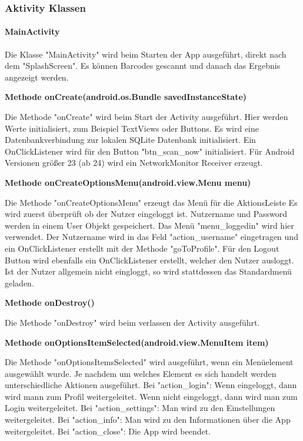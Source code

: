 \documentclass{scrartcl}
\begin{document}
\newpage

\subsubsection{Aktivity Klassen}

\paragraph{MainActivity}

\noindent Die Klasse "MainActivity" wird beim Starten der App ausgeführt, direkt nach dem "SplashScreen". Es können Barcodes gescannt und danach das Ergebnis angezeigt werden.\newline

\noindent\textbf{Methode onCreate(android.os.Bundle savedInstanceState)}

\noindent Die Methode "onCreate" wird beim Start der Activity ausgeführt. Hier werden Werte initialisiert, zum Beispiel TextViews oder Buttons. Es wird eine Datenbankverbindung zur lokalen SQLite Datenbank initialisiert. Ein OnClickListener wird für den Button "btn\_scan\_now" initialisiert. Für Android Versionen größer 23 (ab 24) wird ein NetworkMonitor Receiver erzeugt.\newline

\noindent\textbf{Methode onCreateOptionsMenu(android.view.Menu menu)}

\noindent Die Methode "onCreateOptionsMenu" erzeugt das Menü für die AktionsLeiste Es wird zuerst überprüft ob der Nutzer eingeloggt ist. Nutzername und Password werden in einem User Objekt gespeichert. Das Menü "menu\_loggedin" wird hier verwendet. Der Nutzername wird in das Feld "action\_username" eingetragen und ein OnClickListener erstellt mit der Methode "goToProfile". Für den Logout Button wird ebenfalls ein OnClickListener erstellt, welcher den Nutzer ausloggt. Ist der Nutzer allgemein nicht eingloggt, so wird stattdessen das Standardmenü geladen. \newline

\noindent\textbf{Methode onDestroy()}

\noindent Die Methode "onDestroy" wird beim verlassen der Activity ausgeführt. \newline

\noindent\textbf{Methode onOptionsItemSelected(android.view.MenuItem item)}

\noindent Die Methode "onOptionsItemsSelected" wird ausgeführt, wenn ein Menüelement ausgewählt wurde. Je nachdem um welches Element es sich handelt werden unterschiedliche Aktionen ausgeführt. Bei "action\_login": Wenn eingeloggt, dann wird mann zum Profil weitergeleitet. Wenn nicht eingeloggt, dann wird man zum Login weitergeleitet. Bei "action\_settings": Man wird zu den Einstellungen weitergeleitet. Bei "action\_info": Man wird zu den Informationen über die App weitergeleitet. Bei "action\_close": Die App wird beendet. \newline
\end{document}
